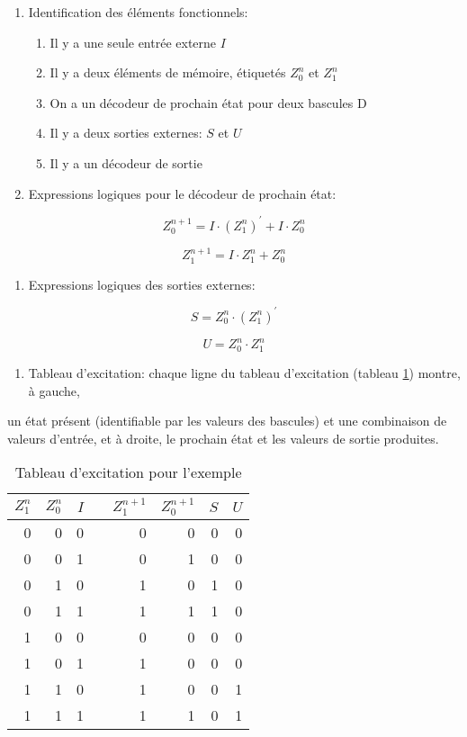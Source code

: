 \documentclass[11pt]{article}
\begin{document}
\begin{enumerate}
\item Identification des éléments fonctionnels:

\begin{enumerate}
\item Il y a une seule entrée externe \(I\)
\item Il y a deux éléments de mémoire, étiquetés \(Z_0^n\) et  \(Z_1^n\)
\item On a un décodeur de prochain état pour deux bascules D
\item Il y a deux sorties externes: \(S\) et \(U\)
\item Il y a un décodeur de sortie
\end{enumerate}

\item Expressions logiques pour le décodeur de prochain état:
\end{enumerate}
$$ Z_0^{n+1} = I \cdot (Z_1^n)^\prime  + I \cdot Z_0^n $$

$$ Z_1^{n+1} = I \cdot Z_1^n +  Z_0^n  $$

\begin{enumerate}
\item Expressions logiques des sorties externes:
\end{enumerate}
$$ S =  Z_0^n \cdot (Z_1^{n})^\prime $$

$$ U =  Z_0^n \cdot Z_1^{n} $$

\begin{enumerate}
\item Tableau d'excitation: chaque ligne du tableau d'excitation (tableau \ref{tab:orga88c18e}) montre, à gauche,
\end{enumerate}
un état présent (identifiable par les valeurs des bascules) et une
combinaison de valeurs d'entrée, et à droite, le prochain état et les
valeurs de sortie produites.

\begin{table}[htbp]
\caption{\label{tab:orga88c18e}Tableau d'excitation pour l'exemple}
\centering
\begin{tabular}{rrrlrrrr}
\(Z_1^n\) & \(Z_0^n\) & \(I\) &  & \(Z_1^{n+1}\) & \(Z_0^{n+1}\) & \(S\) & \(U\)\\[0pt]
\hline
0 & 0 & 0 &  & 0 & 0 & 0 & 0\\[0pt]
0 & 0 & 1 &  & 0 & 1 & 0 & 0\\[0pt]
0 & 1 & 0 &  & 1 & 0 & 1 & 0\\[0pt]
0 & 1 & 1 &  & 1 & 1 & 1 & 0\\[0pt]
1 & 0 & 0 &  & 0 & 0 & 0 & 0\\[0pt]
1 & 0 & 1 &  & 1 & 0 & 0 & 0\\[0pt]
1 & 1 & 0 &  & 1 & 0 & 0 & 1\\[0pt]
1 & 1 & 1 &  & 1 & 1 & 0 & 1\\[0pt]
\end{tabular}
\end{table}
\end{document}
